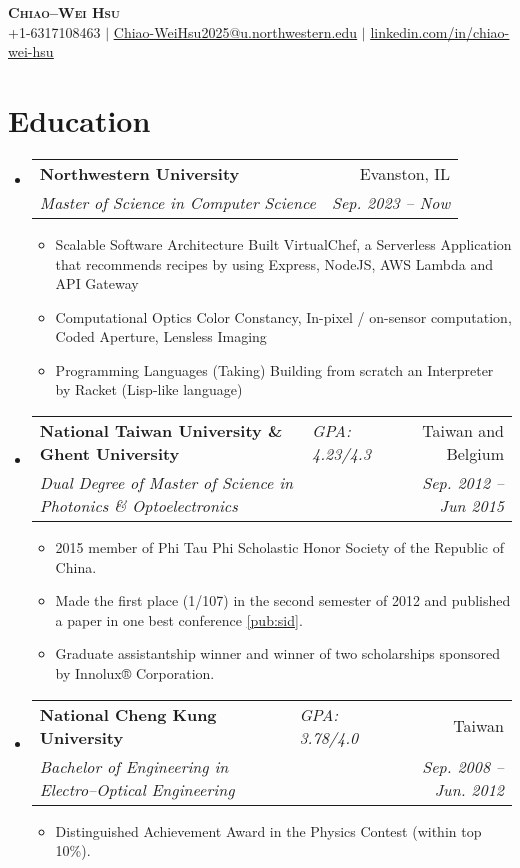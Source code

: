 \documentclass[letterpaper,11pt]{article}
\makeatletter
\newcommand{\resumeItem}[1]{
  \item\small{
    {#1 \vspace{-2pt}}
  }
}
\newcommand{\resumeSubheading}[4]{
  \vspace{-2pt}\item
    \begin{tabular*}{0.97\textwidth}[t]{l@{\extracolsep{\fill}}r}
      \textbf{#1} & #2 \\
      \textit{\small#3} & \textit{\small #4} \\
    \end{tabular*}\vspace{-7pt}
}
\newcommand{\resumeSubheadingII}[5]{
  \vspace{-2pt}\item
    \begin{tabular*}{0.97\textwidth}[t]{ll@{\extracolsep{\fill}}r}
      \textbf{#1} & \textit{\small#5} & #2 \\
      \textit{\small#3} & \textit{} & \textit{\small #4} \\
    \end{tabular*}\vspace{-7pt}
}
\newcommand{\resumeSubHeadingListStart}{\begin{itemize}[leftmargin=0.15in, label={}]}
\newcommand{\resumeSubHeadingListEnd}{\end{itemize}}
\newcommand{\resumeItemListStart}{\begin{itemize}}
\newcommand{\resumeItemListEnd}{\end{itemize}\vspace{-5pt}}
\makeatother
\begin{document}

\begin{center}
    \textbf{\Huge \scshape Chiao--Wei Hsu} \\ \vspace{1pt}
    \small +1-6317108463 $|$ \href{mailto:Chiao-WeiHsu2025@u.northwestern.edu}{\underline{Chiao-WeiHsu2025@u.northwestern.edu}} $|$ 
    \href{https://linkedin.com/in/chiao-wei-hsu}{\underline{linkedin.com/in/chiao-wei-hsu}}
\end{center}


\section{Education}
  \resumeSubHeadingListStart
    \resumeSubheading
      {Northwestern University}{Evanston, IL}
      {Master of Science in Computer Science}{Sep. 2023 -- Now}{}{}
      \resumeItemListStart
        \resumeItem{Scalable Software Architecture}{Built VirtualChef, a Serverless Application that recommends recipes by using Express, NodeJS, AWS Lambda and API Gateway}
        \resumeItem{Computational Optics}{ Color Constancy, In-pixel / on-sensor computation, Coded Aperture, Lensless Imaging}
        \resumeItem{Programming Languages (Taking)}{Building from scratch an Interpreter by Racket (Lisp-like language)}
        \resumeItemListEnd
    \resumeSubheadingII
      {National Taiwan University \& Ghent University}{Taiwan and Belgium}
      {Dual Degree of Master of Science in Photonics \& Optoelectronics}{Sep. 2012 -- Jun 2015}{GPA: 4.23/4.3}
      \resumeItemListStart
        \resumeItem{2015 member of Phi Tau Phi Scholastic Honor Society of the Republic of China.}
        \resumeItem{Made the first place (1/107) in the second semester of 2012 and published a paper in one best conference \ref{pub:sid}.}
        \resumeItem {Graduate assistantship winner and winner of two scholarships sponsored by Innolux® Corporation.}
      \resumeItemListEnd
    \resumeSubheadingII
      {National Cheng Kung University}{Taiwan}{Bachelor of Engineering in Electro--Optical Engineering}{Sep. 2008 -- Jun. 2012}{GPA: 3.78/4.0}
      \resumeItemListStart
        \resumeItem{Distinguished Achievement Award in the Physics Contest (within top 10\%).}
      \resumeItemListEnd
  \resumeSubHeadingListEnd
\end{document}
